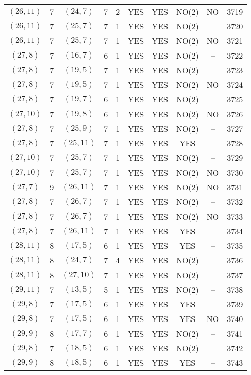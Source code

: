 \begin{longtable}{|c|c|c|c|c|c|c|c|c|c|}
$(26, 11)$ & 7 & $(24, 7)$ & 7 & 2 & YES & YES & NO(2) & NO & 3719\\
$(26, 11)$ & 7 & $(25, 7)$ & 7 & 1 & YES & YES & NO(2) & -- & 3720\\
$(26, 11)$ & 7 & $(25, 7)$ & 7 & 1 & YES & YES & NO(2) & NO & 3721\\
$(27, 8)$ & 7 & $(16, 7)$ & 6 & 1 & YES & YES & NO(2) & -- & 3722\\
$(27, 8)$ & 7 & $(19, 5)$ & 7 & 1 & YES & YES & NO(2) & -- & 3723\\
$(27, 8)$ & 7 & $(19, 5)$ & 7 & 1 & YES & YES & NO(2) & NO & 3724\\
$(27, 8)$ & 7 & $(19, 7)$ & 6 & 1 & YES & YES & NO(2) & -- & 3725\\
$(27, 10)$ & 7 & $(19, 8)$ & 6 & 1 & YES & YES & NO(2) & NO & 3726\\
$(27, 8)$ & 7 & $(25, 9)$ & 7 & 1 & YES & YES & NO(2) & -- & 3727\\
$(27, 8)$ & 7 & $(25, 11)$ & 7 & 1 & YES & YES & YES & -- & 3728\\
$(27, 10)$ & 7 & $(25, 7)$ & 7 & 1 & YES & YES & NO(2) & -- & 3729\\
$(27, 10)$ & 7 & $(25, 7)$ & 7 & 1 & YES & YES & NO(2) & NO & 3730\\
$(27, 7)$ & 9 & $(26, 11)$ & 7 & 1 & YES & YES & NO(2) & NO & 3731\\
$(27, 8)$ & 7 & $(26, 7)$ & 7 & 1 & YES & YES & NO(2) & -- & 3732\\
$(27, 8)$ & 7 & $(26, 7)$ & 7 & 1 & YES & YES & NO(2) & NO & 3733\\
$(27, 8)$ & 7 & $(26, 11)$ & 7 & 1 & YES & YES & YES & -- & 3734\\
$(28, 11)$ & 8 & $(17, 5)$ & 6 & 1 & YES & YES & YES & -- & 3735\\
$(28, 11)$ & 8 & $(24, 7)$ & 7 & 4 & YES & YES & NO(2) & -- & 3736\\
$(28, 11)$ & 8 & $(27, 10)$ & 7 & 1 & YES & YES & NO(2) & -- & 3737\\
$(29, 11)$ & 7 & $(13, 5)$ & 5 & 1 & YES & YES & NO(2) & -- & 3738\\
$(29, 8)$ & 7 & $(17, 5)$ & 6 & 1 & YES & YES & YES & -- & 3739\\
$(29, 8)$ & 7 & $(17, 5)$ & 6 & 1 & YES & YES & YES & NO & 3740\\
$(29, 9)$ & 8 & $(17, 7)$ & 6 & 1 & YES & YES & NO(2) & -- & 3741\\
$(29, 8)$ & 7 & $(18, 5)$ & 6 & 1 & YES & YES & NO(2) & -- & 3742\\
$(29, 9)$ & 8 & $(18, 5)$ & 6 & 1 & YES & YES & YES & -- & 3743\\

\end{longtable}
